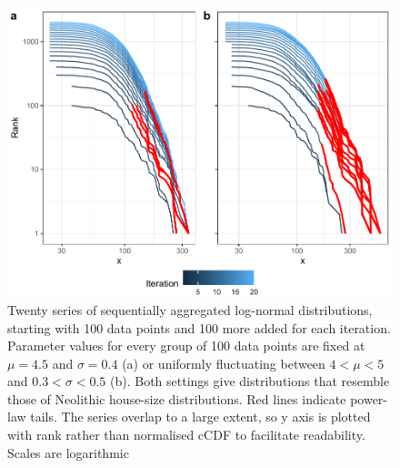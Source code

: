 \documentclass[
  12pt,
]{book}
\begin{document}
\begin{figure}

{\centering \includegraphics[width=0.9\linewidth]{bookdown-demo_files/figure-latex/05-multi-ln-1} 

}

\caption{Twenty series of sequentially aggregated log-normal distributions, starting with 100 data points and 100 more added for each iteration. Parameter values for every group of 100 data points are fixed at \(\mu = 4.5\) and \(\sigma = 0.4\) (a) or uniformly fluctuating between \(4 < \mu < 5\) and \(0.3 < \sigma < 0.5\) (b). Both settings give distributions that resemble those of Neolithic house-size distributions. Red lines indicate power-law tails. The series overlap to a large extent, so y axis is plotted with rank rather than normalised cCDF to facilitate readability. Scales are logarithmic}\label{fig:05-multi-ln}
\end{figure}
\end{document}

